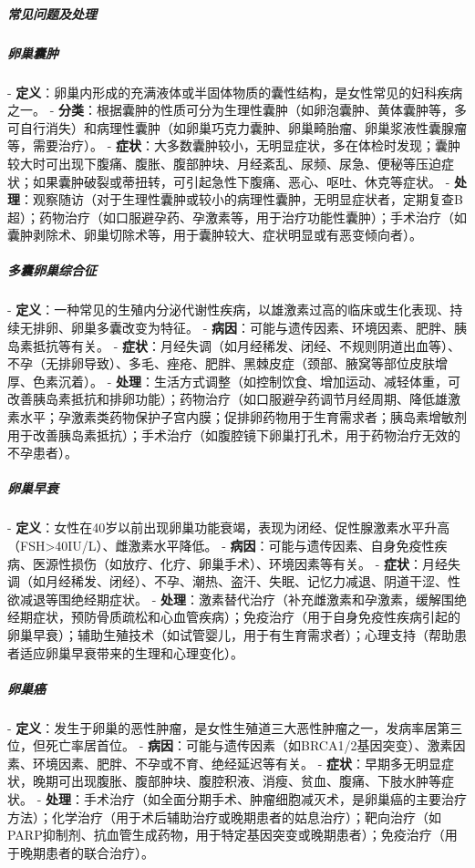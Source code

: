 \begin{enumerate}
\subparagraph{常见问题及处理}

\subparagraph{卵巢囊肿}
- \textbf{定义}：卵巢内形成的充满液体或半固体物质的囊性结构，是女性常见的妇科疾病之一。
- \textbf{分类}：根据囊肿的性质可分为生理性囊肿（如卵泡囊肿、黄体囊肿等，多可自行消失）和病理性囊肿（如卵巢巧克力囊肿、卵巢畸胎瘤、卵巢浆液性囊腺瘤等，需要治疗）。
- \textbf{症状}：大多数囊肿较小，无明显症状，多在体检时发现；囊肿较大时可出现下腹痛、腹胀、腹部肿块、月经紊乱、尿频、尿急、便秘等压迫症状；如果囊肿破裂或蒂扭转，可引起急性下腹痛、恶心、呕吐、休克等症状。
- \textbf{处理}：观察随访（对于生理性囊肿或较小的病理性囊肿，无明显症状者，定期复查B超）；药物治疗（如口服避孕药、孕激素等，用于治疗功能性囊肿）；手术治疗（如囊肿剥除术、卵巢切除术等，用于囊肿较大、症状明显或有恶变倾向者）。

\subparagraph{多囊卵巢综合征}
- \textbf{定义}：一种常见的生殖内分泌代谢性疾病，以雄激素过高的临床或生化表现、持续无排卵、卵巢多囊改变为特征。
- \textbf{病因}：可能与遗传因素、环境因素、肥胖、胰岛素抵抗等有关。
- \textbf{症状}：月经失调（如月经稀发、闭经、不规则阴道出血等）、不孕（无排卵导致）、多毛、痤疮、肥胖、黑棘皮症（颈部、腋窝等部位皮肤增厚、色素沉着）。
- \textbf{处理}：生活方式调整（如控制饮食、增加运动、减轻体重，可改善胰岛素抵抗和排卵功能）；药物治疗（如口服避孕药调节月经周期、降低雄激素水平；孕激素类药物保护子宫内膜；促排卵药物用于生育需求者；胰岛素增敏剂用于改善胰岛素抵抗）；手术治疗（如腹腔镜下卵巢打孔术，用于药物治疗无效的不孕患者）。

\subparagraph{卵巢早衰}
- \textbf{定义}：女性在40岁以前出现卵巢功能衰竭，表现为闭经、促性腺激素水平升高（FSH>40IU/L）、雌激素水平降低。
- \textbf{病因}：可能与遗传因素、自身免疫性疾病、医源性损伤（如放疗、化疗、卵巢手术）、环境因素等有关。
- \textbf{症状}：月经失调（如月经稀发、闭经）、不孕、潮热、盗汗、失眠、记忆力减退、阴道干涩、性欲减退等围绝经期症状。
- \textbf{处理}：激素替代治疗（补充雌激素和孕激素，缓解围绝经期症状，预防骨质疏松和心血管疾病）；免疫治疗（用于自身免疫性疾病引起的卵巢早衰）；辅助生殖技术（如试管婴儿，用于有生育需求者）；心理支持（帮助患者适应卵巢早衰带来的生理和心理变化）。

\subparagraph{卵巢癌}
- \textbf{定义}：发生于卵巢的恶性肿瘤，是女性生殖道三大恶性肿瘤之一，发病率居第三位，但死亡率居首位。
- \textbf{病因}：可能与遗传因素（如BRCA1/2基因突变）、激素因素、环境因素、肥胖、不孕或不育、绝经延迟等有关。
- \textbf{症状}：早期多无明显症状，晚期可出现腹胀、腹部肿块、腹腔积液、消瘦、贫血、腹痛、下肢水肿等症状。
- \textbf{处理}：手术治疗（如全面分期手术、肿瘤细胞减灭术，是卵巢癌的主要治疗方法）；化学治疗（用于术后辅助治疗或晚期患者的姑息治疗）；靶向治疗（如PARP抑制剂、抗血管生成药物，用于特定基因突变或晚期患者）；免疫治疗（用于晚期患者的联合治疗）。


\end{enumerate}
